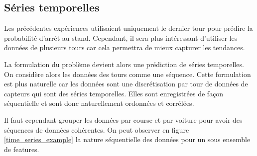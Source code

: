 \subsection{Séries temporelles}

Les précédentes expériences utilisaient uniquement le dernier tour pour prédire la probabilité d'arrêt au stand.
Cependant, il sera plus intéressant d'utiliser les données de plusieurs tours car cela permettra de mieux capturer les tendances.

La formulation du problème devient alors une prédiction de séries temporelles.
On considère alors les données des tours comme une séquence.
Cette formulation est plus naturelle car les données sont une discrétisation par tour de données de capteurs qui sont des séries temporelles.
Elles sont enregistrées de façon séquentielle et sont donc naturellement ordonnées et corrélées.

Il faut cependant grouper les données par course et par voiture pour avoir des séquences de données cohérentes.
On peut observer en figure \ref{time_series_example} la nature séquentielle des données pour un sous ensemble de features.
